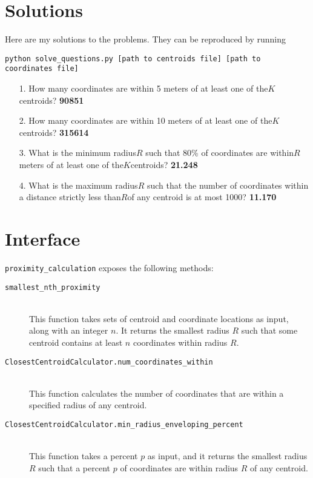 \documentclass{amsart}
\theoremstyle{definition}
\theoremstyle{definition}
\begin{document}
\section{Solutions}
Here are my solutions to the problems.  They can be reproduced by running
\begin{center}
  \texttt{python solve\_questions.py [path to centroids file] [path to coordinates file]}
\end{center}
\begin{itemize}
  \item[1.] How many coordinates are within 5 meters of at least one of the ​$K$ ​centroids? \textbf{90851}
  \item[2.] How many coordinates are within 10 meters of at least one of the ​$K$ ​centroids? \textbf{315614}
  \item[3.] What is the minimum radius ​$R$ such that 80\% of coordinates are within ​$R$ ​meters of at least one of the ​$K$ ​centroids? \textbf{21.248}
  \item[4.] What is the maximum radius ​$R$ such that the number of coordinates within a distance strictly less than ​$R$ ​of any centroid is at most 1000? \textbf{11.170}
\end{itemize}

\section{Interface}
\texttt{proximity\_calculation} exposes the following methods:
\begin{description}
\item[\texttt{smallest\_nth\_proximity}]\ \\
  This function takes sets of centroid and coordinate locations as input, along with an integer $n$.  It returns the smallest radius $R$ such that some centroid contains at least $n$ coordinates within radius $R$.
\item[\texttt{ClosestCentroidCalculator.num\_coordinates\_within}]\ \\
  This function calculates the number of coordinates that are within a specified radius of any centroid.
\item[\texttt{ClosestCentroidCalculator.min\_radius\_enveloping\_percent}]\ \\
  This function takes a percent $p$ as input, and it returns the smallest radius $R$ such that a percent $p$ of coordinates are within radius $R$ of any centroid.
\end{description}
\end{document}

